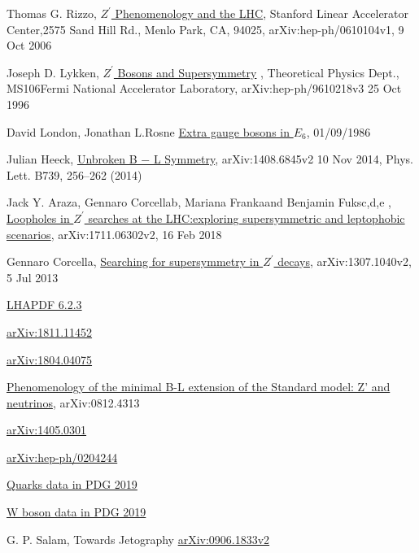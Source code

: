 \documentclass[12pt,a4paper]{article}		%
\begin{document}
\begin{thebibliography}{}
	 Thomas G. Rizzo, \href{https://arxiv.org/pdf/hep-ph/0610104.pdf}{$Z^\prime$ Phenomenology and the LHC},  Stanford Linear Accelerator Center,2575 Sand Hill Rd., Menlo Park, CA, 94025, arXiv:hep-ph/0610104v1,  9 Oct 2006
	
	 Joseph D. Lykken, \href{https://arxiv.org/pdf/hep-ph/9610218.pdf}{$Z^\prime$ Bosons and Supersymmetry} , Theoretical Physics Dept., MS106Fermi National Accelerator Laboratory, arXiv:hep-ph/9610218v3  25 Oct 1996
	
	 David London, Jonathan L.Rosne \href{https://journals.aps.org/prd/pdf/10.1103/PhysRevD.34.1530}{Extra gauge bosons in $E_6$}, 01/09/1986
	
	 Julian Heeck, \href{https://arxiv.org/pdf/1408.6845.pdf}{Unbroken B − L Symmetry}, arXiv:1408.6845v2 10 Nov 2014, Phys. Lett. B739, 256–262 (2014) 
	
	 Jack Y. Araza, Gennaro Corcellab, Mariana Frankaand Benjamin Fuksc,d,e , \href{https://arxiv.org/pdf/1711.06302.pdf}{Loopholes in $Z^\prime$ searches at the LHC:exploring supersymmetric and leptophobic scenarios}, arXiv:1711.06302v2, 16 Feb 2018 
	
	 Gennaro Corcella, \href{https://arxiv.org/pdf/1307.1040.pdf}{Searching for supersymmetry in $Z^\prime$ decays}, arXiv:1307.1040v2, 5 Jul 2013
	
	 \href{https://lhapdf.hepforge.org/pdfsets}{LHAPDF 6.2.3}
	
	 \href{https://arxiv.org/abs/1811.11452}{arXiv:1811.11452}
	
	 \href{https://arxiv.org/abs/1804.04075}{arXiv:1804.04075}
	
	 \href{https://arxiv.org/abs/0812.4313}{Phenomenology of the minimal B-L extension of the Standard model: Z' and neutrinos}, arXiv:0812.4313
	
	 \href{https://arxiv.org/abs/1405.0301}{arXiv:1405.0301}
	
	\href{https://arxiv.org/abs/hep-ph/0204244}{arXiv:hep-ph/0204244}
	
	 \href{http://pdg.lbl.gov/2019/tables/rpp2019-sum-quarks.pdf}{Quarks data in PDG 2019}
	
	 \href{http://pdg.lbl.gov/2019/listings/rpp2019-list-w-boson.pdf}{W boson data in PDG 2019}
	
	 G. P. Salam, Towards Jetography \href{https://arxiv.org/abs/0906.1833}{arXiv:0906.1833v2}
	

\end{thebibliography}
\end{document}
